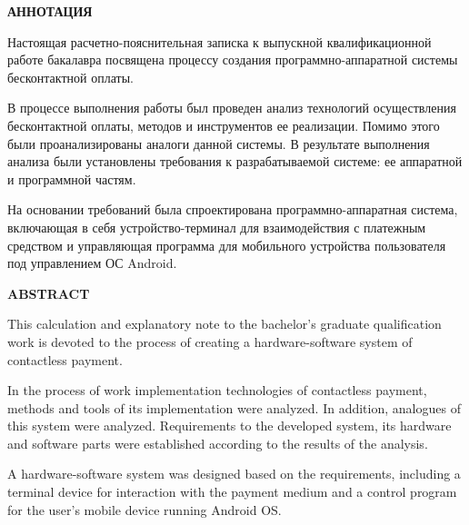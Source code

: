 \newpage

\begin{center}
  \textbf{АННОТАЦИЯ}
\end{center}

Настоящая расчетно-пояснительная записка к выпускной квалификационной работе бакалавра посвящена процессу создания программно-аппаратной системы бесконтактной оплаты.

В процессе выполнения работы был проведен анализ технологий осуществления бесконтактной оплаты, методов и инструментов ее реализации. 
Помимо этого были проанализированы аналоги данной системы.
В результате выполнения анализа были установлены требования к разрабатываемой системе: ее аппаратной и программной частям.

На основании требований была спроектирована программно-аппаратная система, включающая в себя устройство-терминал для взаимодействия с платежным средством и управляющая программа для мобильного устройства пользователя под управлением ОС Android.

\begin{center}
  \textbf{ABSTRACT}
\end{center}

This calculation and explanatory note to the bachelor's graduate qualification work is devoted to the process of creating a hardware-software system of contactless payment.

In the process of work implementation technologies of contactless payment, methods and tools of its implementation were analyzed. 
In addition, analogues of this system were analyzed.
Requirements to the developed system, its hardware and software parts were established according to the results of the analysis.

A hardware-software system was designed based on the requirements, including a terminal device for interaction with the payment medium and a control program for the user's mobile device running Android OS.